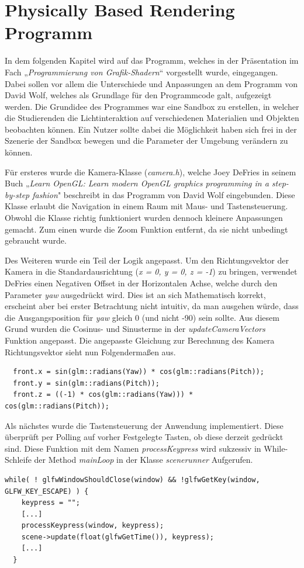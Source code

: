 \documentclass[
  11pt,
  a4paper,
  oneside
  ]{article}
\begin{document}
\section{Physically Based Rendering Programm}
In dem folgenden Kapitel wird auf das Programm, welches in der Präsentation im Fach „\textit{Programmierung von Grafik-Shadern}“ vorgestellt wurde, eingegangen. Dabei sollen vor allem die Unterschiede und Anpassungen an dem Programm von David Wolf, welches als Grundlage für den Programmcode galt, aufgezeigt werden. Die Grundidee des Programmes war eine Sandbox zu erstellen, in welcher die Studierenden die Lichtinteraktion auf verschiedenen Materialien und Objekten beobachten können. Ein Nutzer sollte dabei die Möglichkeit haben sich frei in der Szenerie der Sandbox bewegen und die Parameter der Umgebung verändern zu können.

Für ersteres wurde die Kamera-Klasse (\textit{camera.h}), welche Joey DeFries in seinem Buch „\textit{Learn OpenGL: Learn modern OpenGL graphics programming in a step-by-step fashion}"\cite{learnOpenGL} beschreibt in das Programm von David Wolf eingebunden. Diese Klasse erlaubt die Navigation in einem Raum mit Maus- und Tastensteuerung. Obwohl die Klasse richtig funktioniert wurden dennoch kleinere Anpassungen gemacht. Zum einen wurde die Zoom Funktion entfernt, da sie nicht unbedingt gebraucht wurde. 

Des Weiteren wurde ein Teil der Logik angepasst. Um den Richtungsvektor der Kamera in die Standardausrichtung (\textit{x = 0, y = 0, z = -1}) zu bringen, verwendet DeFries einen Negativen Offset in der Horizontalen Achse, welche durch den Parameter \textit{yaw} ausgedrückt wird. Dies ist an sich Mathematisch korrekt, erscheint aber bei erster Betrachtung nicht intuitiv, da man ausgehen würde, dass die Ausgangsposition für \textit{yaw} gleich 0 (und nicht -90) sein sollte. Aus diesem Grund wurden die Cosinus- und Sinusterme in der \textit{updateCameraVectors} Funktion angepasst. Die angepasste Gleichung zur Berechnung des Kamera Richtungsvektor sieht nun Folgendermaßen aus.
\begin{lstlisting}
  front.x = sin(glm::radians(Yaw)) * cos(glm::radians(Pitch));
  front.y = sin(glm::radians(Pitch));
  front.z = ((-1) * cos(glm::radians(Yaw))) * cos(glm::radians(Pitch));
\end{lstlisting}\hfill \break

Als nächstes wurde die Tastensteuerung der Anwendung implementiert. Diese überprüft per Polling auf vorher Festgelegte Tasten, ob diese derzeit gedrückt sind. Diese Funktion mit dem Namen \textit{processKeypress} wird sukzessiv in While-Schleife der Method \textit{mainLoop} in der Klasse \textit{scenerunner} Aufgerufen.  
\begin{lstlisting}[tabsize=2]
  while( ! glfwWindowShouldClose(window) && !glfwGetKey(window, GLFW_KEY_ESCAPE) ) {
    keypress = "";
    [...]
    processKeypress(window, keypress);
    scene->update(float(glfwGetTime()), keypress);
    [...]
  }
\end{lstlisting}
\end{document}
